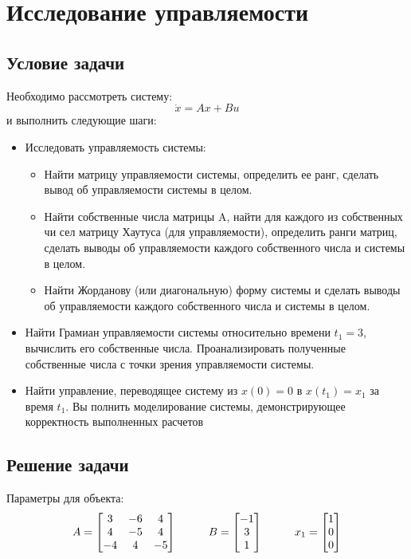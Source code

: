 \chapter{Исследование управляемости}
\label{ch:chap1}
\section{Условие задачи}

Необходимо рассмотреть систему:
$$
  \dot{x} = Ax + Bu
$$ и выполнить следующие шаги:

\begin{itemize}
\item  Исследовать управляемость системы:
  \begin{itemize}
    \item Найти матрицу управляемости системы, определить ее ранг, сделать вывод об управляемости системы в целом.
    \item Найти собственные числа матрицы A, найти для каждого из собственных чи
    сел матрицу Хаутуса (для управляемости), определить ранги матриц, сделать
     выводы об управляемости каждого собственного числа и системы в целом.
     \item Найти Жорданову (или диагональную) форму системы и сделать выводы об
     управляемости каждого собственного числа и системы в целом.
  \end{itemize}
  \item Найти Грамиан управляемости системы относительно времени $t_1 = 3$, вычислить
  его собственные числа. Проанализировать полученные собственные числа с точки
  зрения управляемости системы.
  \item Найти управление, переводящее систему из $x(0) = 0$ в $x(t_1) = x_1$ за время $t_1$. Вы
  полнить моделирование системы, демонстрирующее корректность выполненных
   расчетов
\end{itemize}

\section{Решение задачи}

Параметры для объекта:
$$
  A = \begin{bmatrix}
  3 & -6 & 4 \\
  4 & -5 & 4 \\
  -4 & 4 & -5 
  \end{bmatrix} \hspace*{1cm}
  B = \begin{bmatrix}
    -1 \\ 3 \\ 1 
  \end{bmatrix} \hspace*{1cm}
  x_1 = \begin{bmatrix}
  1 \\ 0 \\ 0
  \end{bmatrix} 
$$

